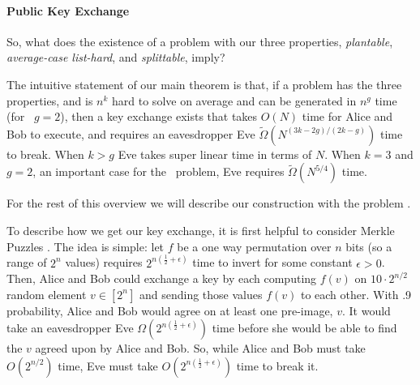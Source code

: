 \paragraph{Public Key Exchange}

So, what does the existence of a problem with our three properties, \emph{plantable}, \emph{average-case list-hard}, and \emph{splittable}, imply?

The intuitive statement of our main theorem is that, if a problem has the three properties, and is $n^k$ hard to solve on average and can be generated in $n^g$ time (for \zkclique~$g=2$), then a key exchange exists that takes $O(N)$ time for Alice and Bob to execute, and requires an eavesdropper Eve $\tilde{\Omega}(N^{(3k-2g)/(2k-g)})$ time to break. When $k>g$ Eve takes super linear time in terms of $N$. When $k=3$ and $g=2$, an important case for the \zkclique~problem, Eve requires $\tilde{\Omega}(N^{5/4})$ time. 

For the rest of this overview we will describe our construction with the problem \zkclique. 

To describe how we get our key exchange, it is first helpful to consider Merkle Puzzles \cite{Merkle78,BGI08,optimalMerklePuzzles}. The idea is simple: let $f$ be a one way permutation over $n$ bits (so a range of $2^n$ values) requires $2^{n(\frac{1}{2}+\epsilon)}$ time to invert for some constant $\epsilon>0$. Then, Alice and Bob could exchange a key by each computing $f(v)$ on  $10\cdot2^{n/2}$ random element $v \in [2^{n}]$ and sending those values $f(v)$ to each other. With .9 probability, Alice and Bob would agree on at least one pre-image, $v$. It would take an eavesdropper Eve $\Omega(2^{n(\frac{1}{2}+\epsilon)})$ time before she would be able to find the $v$ agreed upon by Alice and Bob. So, while Alice and Bob must take $O(2^{n/2})$ time, Eve must take $O(2^{n(\frac{1}{2}+\epsilon)})$ time to break it. 



